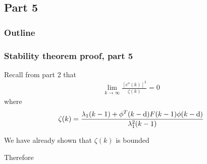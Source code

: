 \subsection{Part 5}
\begin{frame}
    \frametitle{Outline}
    \tableofcontents[currentsection]
\end{frame}


\begin{frame}
    \frametitle{Stability theorem proof, part 5}

    Recall from part 2 that
    \begin{align*}
        \lim_{k \rightarrow \infty} \frac{ [e^o(k)]^2 }{ \zeta(k) } = 0
    \end{align*}
    where
    \begin{align*}
        \zeta(k) = \frac{\lambda_1(k-1) + \phi^T(k-\textrm{d}) F(k-1) \phi(k-\textrm{d})}{\lambda_1^2(k-1)}
    \end{align*}
    \pause
    
    We have already shown that $\zeta(k)$ is bounded
    \pause
    
    Therefore

\end{frame}


